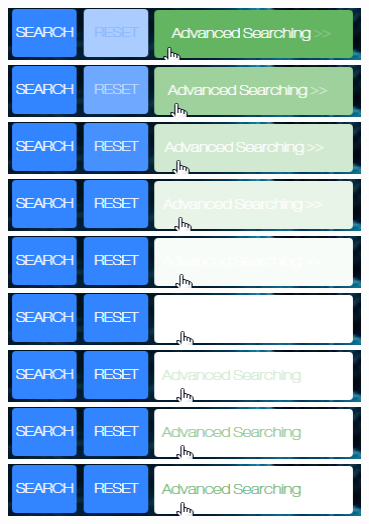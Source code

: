 \documentclass[10pt,twoside,a4paper,titlepage]{article}
\begin{document}
	\newline
	\includegraphics[width=0.7\textwidth]{cyf/Advanced_searching3.png}
	\newline	
	\includegraphics[width=0.7\textwidth]{cyf/Advanced_searching4.png}
	\newline	
	\includegraphics[width=0.7\textwidth]{cyf/Advanced_searching5.png}
	\newline	
	\includegraphics[width=0.7\textwidth]{cyf/Advanced_searching6.png}
	\newline	
	\includegraphics[width=0.7\textwidth]{cyf/Advanced_searching7.png}
	\newline
	\includegraphics[width=0.7\textwidth]{cyf/Advanced_searching8.png}
	\newline
	\includegraphics[width=0.7\textwidth]{cyf/Advanced_searching9.png}
	\newline
	\includegraphics[width=0.7\textwidth]{cyf/Advanced_searching10.png}
	\newline	
	\includegraphics[width=0.7\textwidth]{cyf/Advanced_searching11.png}
\end{document}
